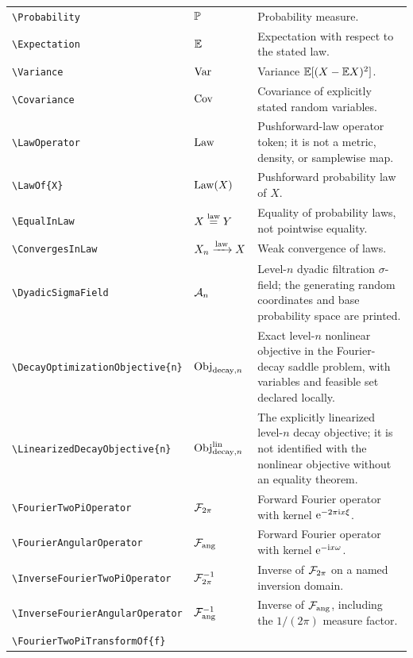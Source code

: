 \documentclass[11pt,oneside]{article}
\theoremstyle{definition}
\theoremstyle{remark}
\DeclareRobustCommand{\commandname}[1]{\texttt{\textbackslash#1}}
\begin{document}
\begin{longtable}{@{}S{0.35\textwidth}L{0.14\textwidth}L{0.45\textwidth}@{}}
\commandname{Probability} & $\mathbb{P}$ & Probability measure.\\
\commandname{Expectation} & $\mathbb{E}$ & Expectation with respect to the stated law.\\
\commandname{Variance} & $\operatorname{Var}$ & Variance $\mathbb{E}[(X-\mathbb{E} X)^2]$.\\
\commandname{Covariance} & $\operatorname{Cov}$ & Covariance of explicitly stated random
variables.\\
\commandname{LawOperator} & $\operatorname{Law}$ & Pushforward-law operator token; it is not a
metric, density, or samplewise map.\\
\commandname{LawOf}\texttt{\{X\}} & $\operatorname{Law}\!\left(X\right)$ & Pushforward probability law of $X$.\\
\commandname{EqualInLaw} & $X\mathrel{\overset{\mathrm{law}}{=}} Y$ & Equality of probability laws, not
pointwise equality.\\
\commandname{ConvergesInLaw} & $X_n\mathrel{\xrightarrow{\mathrm{law}}} X$ & Weak convergence of laws.\\
\commandname{DyadicSigmaField} & $\mathcal{A}_n$ & Level-$n$ dyadic filtration
$\sigma$-field; the generating random coordinates and base probability space are printed.\\
\commandname{DecayOptimizationObjective}\texttt{\{n\}} &
$\operatorname{Obj}_{\mathrm{decay},n}$ & Exact level-$n$ nonlinear objective in the
Fourier-decay saddle problem, with variables and feasible set declared locally.\\
\commandname{LinearizedDecayObjective}\texttt{\{n\}} &
$\operatorname{Obj}^{\mathrm{lin}}_{\mathrm{decay},n}$ & The explicitly linearized level-$n$ decay objective;
it is not identified with the nonlinear objective without an equality theorem.\\
\commandname{FourierTwoPiOperator} & $\mathcal{F}_{2\pi}$ & Forward Fourier operator
with kernel $\mathrm{e}^{-2\pi\mathrm{i} x\xi}$.\\
\commandname{FourierAngularOperator} & $\mathcal{F}_{\mathrm{ang}}$ & Forward Fourier
operator with kernel $\mathrm{e}^{-\mathrm{i} x\omega}$.\\
\commandname{InverseFourierTwoPiOperator} & $\mathcal{F}_{2\pi}^{-1}$ & Inverse of
$\mathcal{F}_{2\pi}$ on a named inversion domain.\\
\commandname{InverseFourierAngularOperator} & $\mathcal{F}_{\mathrm{ang}}^{-1}$ & Inverse
of $\mathcal{F}_{\mathrm{ang}}$, including the $1/(2\pi)$ measure factor.\\
\commandname{FourierTwoPiTransformOf}\texttt{\{f\}} &

\end{longtable}
\end{document}
